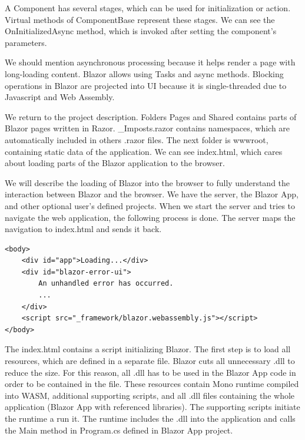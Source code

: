 A Component has several stages, which can be used for initialization or action.
Virtual methods of ComponentBase represent these stages.
We can see the OnInitializedAsync method, which is invoked after setting the component's parameters.
\par
We should mention asynchronous processing because it helps render a page with long-loading content.
Blazor allows using Tasks and async methods.
Blocking operations in Blazor are projected into UI because it is single-threaded due to Javascript and Web Assembly.
\par
We return to the project description. 
Folders Pages and Shared contains parts of Blazor pages written in Razor.
\_Imposts.razor contains namespaces, which are automatically included in others .razor files.
The next folder is wwwroot, containing static data of the application.
We can see index.html, which cares about loading parts of the Blazor application to the browser.
\par
We will describe the loading of Blazor into the browser to fully understand the interaction between Blazor and the browser.
We have the server, the Blazor App, and other optional user's defined projects. 
When we start the server and tries to navigate the web application, the following process is done.
The server maps the navigation to index.html and sends it back.
\par
\begin{minipage}[c]{0.95\textwidth}
\begin{lstlisting}[basicstyle=\small, caption=A Javascript code., label={lst:Javascript}]
<body>
    <div id="app">Loading...</div>
    <div id="blazor-error-ui">
        An unhandled error has occurred.
		...
    </div>
    <script src="_framework/blazor.webassembly.js"></script>
</body>

\end{lstlisting}
\end{minipage}
\par 
The index.html contains a script initializing Blazor.
The first step is to load all resources, which are defined in a separate file.
Blazor cuts all unnecessary .dll to reduce the size.
For this reason, all .dll has to be used in the Blazor App code in order to be contained in the file. 
These resources contain Mono runtime compiled into WASM, additional supporting scripts, and all .dll files containing the whole application (Blazor App with referenced libraries).
The supporting scripts initiate the runtime a run it.
The runtime includes the .dll into the application and calls the Main method in Program.cs defined in Blazor App project.
